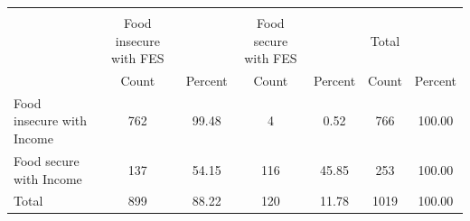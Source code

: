 {
\def\sym#1{\ifmmode^{#1}\else\(^{#1}\)\fi}
\begin{tabular}{l*{3}{cc}}
\hline\hline
            &\multicolumn{6}{c}{}                                                                           \\
            &Food insecure with FES&               &Food secure with FES&               &          Total&               \\
            &          Count&        Percent&          Count&        Percent&          Count&        Percent\\
\hline
Food insecure with Income&            762&          99.48&              4&           0.52&            766&         100.00\\
Food secure with Income&            137&          54.15&            116&          45.85&            253&         100.00\\
Total       &            899&          88.22&            120&          11.78&           1019&         100.00\\
\hline\hline
\end{tabular}
}
